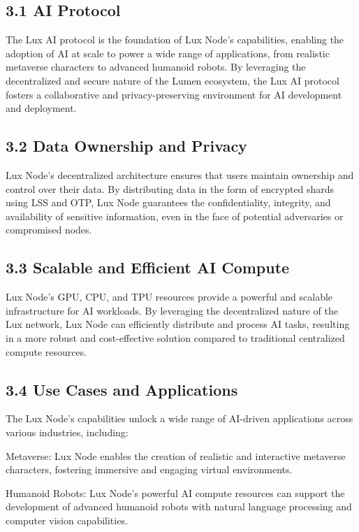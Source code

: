 \documentclass[11pt]{article}
\begin{document}
\subsection{3.1 AI Protocol}

The Lux AI protocol is the foundation of Lux Node's capabilities, enabling the adoption of AI at scale to power a wide range of applications, from realistic metaverse characters to advanced humanoid robots. By leveraging the decentralized and secure nature of the Lumen ecosystem, the Lux AI protocol fosters a collaborative and privacy-preserving environment for AI development and deployment.


\subsection{3.2 Data Ownership and Privacy}

Lux Node's decentralized architecture ensures that users maintain ownership and control over their data. By distributing data in the form of encrypted shards using LSS and OTP, Lux Node guarantees the confidentiality, integrity, and availability of sensitive information, even in the face of potential adversaries or compromised nodes.


\subsection{3.3 Scalable and Efficient AI Compute}

Lux Node's GPU, CPU, and TPU resources provide a powerful and scalable infrastructure for AI workloads. By leveraging the decentralized nature of the Lux network, Lux Node can efficiently distribute and process AI tasks, resulting in a more robust and cost-effective solution compared to traditional centralized compute resources.


\subsection{3.4 Use Cases and Applications}

The Lux Node's capabilities unlock a wide range of AI-driven applications across various industries, including:


Metaverse: Lux Node enables the creation of realistic and interactive metaverse characters, fostering immersive and engaging virtual environments.


Humanoid Robots: Lux Node's powerful AI compute resources can support the development of advanced humanoid robots with natural language processing and computer vision capabilities.
\end{document}
